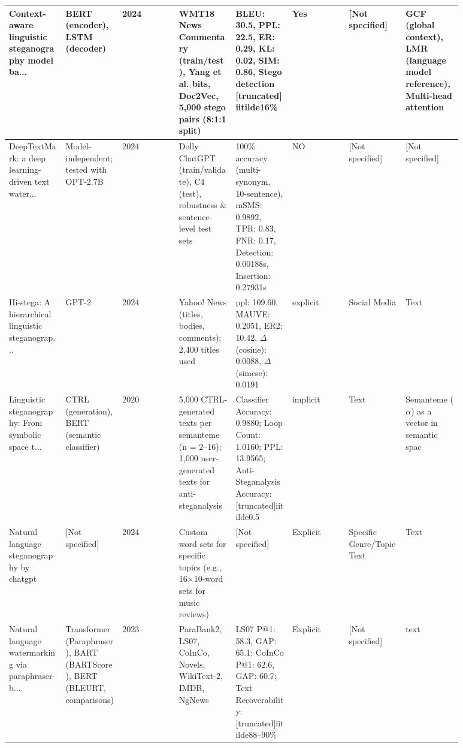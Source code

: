 \begin{longtable}{|p{0.11\linewidth}|p{0.11\linewidth}|p{0.11\linewidth}|p{0.11\linewidth}|p{0.11\linewidth}|p{0.11\linewidth}|p{0.11\linewidth}|p{0.11\linewidth}|}
Context-aware linguistic steganography model ba... \cite{ding2023context} & BERT (encoder), LSTM (decoder) & 2024 & WMT18 News Commentary (train/test), Yang et al. bits, Doc2Vec, 5,000 stego pairs (8:1:1 split) & BLEU: 30.5, PPL: 22.5, ER: 0.29, KL: 0.02, SIM: 0.86, Stego detection [truncated]iitilde{}16\% & Yes & [Not specified] & GCF (global context), LMR (language model reference), Multi-head attention \\
\hline

DeepTextMark: a deep learning-driven text water... \cite{munyer2024deeptextmark} & Model-independent; tested with OPT-2.7B & 2024 & Dolly ChatGPT (train/validate), C4 (test), robustness \& sentence-level test sets & 100\% accuracy (multi-synonym, 10-sentence), mSMS: 0.9892, TPR: 0.83, FNR: 0.17, Detection: 0.00188s, Insertion: 0.27931s & NO & [Not specified] & [Not specified] \\
\hline

Hi-stega: A hierarchical linguistic steganograp... \cite{wang2023hi} & GPT-2 & 2024 & Yahoo! News (titles, bodies, comments); 2,400 titles used & ppl: 109.60, MAUVE: 0.2051, ER2: 10.42, \ensuremath{\Delta}(cosine): 0.0088, \ensuremath{\Delta}(simcse): 0.0191 & explicit & Social Media & Text \\
\hline

Linguistic steganography: From symbolic space t... \cite{zhang2020linguistic} & CTRL (generation), BERT (semantic classifier) & 2020 & 5,000 CTRL-generated texts per semanteme (n = 2--16); 1,000 user-generated texts for anti-steganalysis & Classifier Accuracy: 0.9880; Loop Count: 1.0160; PPL: 13.9565; Anti-Steganalysis Accuracy: [truncated]iitilde{}0.5 & implicit & Text & Semanteme (\ensuremath{\alpha}) as a vector in semantic spac \\
\hline

Natural language steganography by chatgpt \cite{steinebach2024natural} & [Not specified] & 2024 & Custom word sets for specific topics (e.g., 16\ensuremath{\times}10-word sets for music reviews) & [Not specified] & Explicit & Specific Genre/Topic Text & Text \\
\hline

Natural language watermarking via paraphraser-b... \cite{qiang2023natural} & Transformer (Paraphraser), BART (BARTScore), BERT (BLEURT, comparisons) & 2023 & ParaBank2, LS07, CoInCo, Novels, WikiText-2, IMDB, NgNews & LS07 P@1: 58.3, GAP: 65.1; CoInCo P@1: 62.6, GAP: 60.7; Text Recoverability: [truncated]iitilde{}88--90\% & Explicit & [Not specified] & text \\
\hline


\end{longtable}
